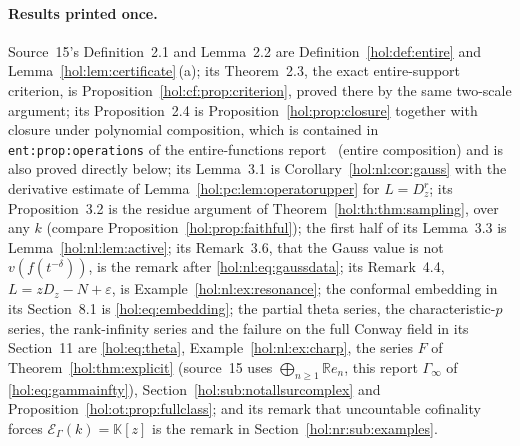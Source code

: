 \documentclass[11pt]{article}
\numberwithin{equation}{section}
\theoremstyle{definition}
\theoremstyle{remark}
\newcommand{\R}{\mathbb R}
\newcommand{\KK}{\mathbb K}
\newcommand{\EK}{\mathcal E_\Gamma(k)}
\begin{document}
\paragraph{Results printed once.}
Source~15's Definition~2.1 and Lemma~2.2 are Definition~\ref{hol:def:entire} and
Lemma~\ref{hol:lem:certificate}\,(a); its Theorem~2.3, the exact entire-support
criterion, is Proposition~\ref{hol:cf:prop:criterion}, proved there by the same
two-scale argument; its Proposition~2.4 is Proposition~\ref{hol:prop:closure}
together with closure under polynomial composition, which is contained in
\texttt{ent:prop:operations} of the entire-functions report~\cite{repoentire}
(entire composition) and is also proved directly below; its Lemma~3.1 is
Corollary~\ref{hol:nl:cor:gauss} with the derivative estimate of
Lemma~\ref{hol:pc:lem:operatorupper} for $L=D_z^r$; its Proposition~3.2 is the
residue argument of Theorem~\ref{hol:th:thm:sampling}, over any $k$ (compare
Proposition~\ref{hol:prop:faithful}); the first half of its Lemma~3.3 is
Lemma~\ref{hol:nl:lem:active}; its Remark~3.6, that the Gauss value is not
$v(f(t^{-\delta}))$, is the remark after \eqref{hol:nl:eq:gaussdata}; its
Remark~4.4, $L=zD_z-N+\varepsilon$, is Example~\ref{hol:nl:ex:resonance}; the
conformal embedding in its Section~8.1 is \eqref{hol:eq:embedding}; the partial
theta series, the characteristic-$p$ series, the rank-infinity series and the
failure on the full Conway field in its Section~11 are \eqref{hol:eq:theta},
Example~\ref{hol:nl:ex:charp}, the series $F$ of Theorem~\ref{hol:thm:explicit} (source~15
uses $\bigoplus_{n\ge1}\R e_n$, this report $\Gamma_\infty$ of
\eqref{hol:eq:gammainfty}), Section~\ref{hol:sub:notallsurcomplex}
and Proposition~\ref{hol:ot:prop:fullclass}; and its remark that uncountable
cofinality forces $\EK=\KK[z]$ is the remark in Section~\ref{hol:nr:sub:examples}.
\end{document}
